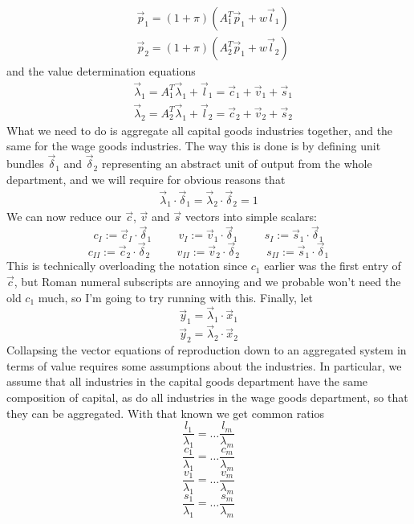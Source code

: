 \begin{align}
	& \vec{p}_1 = (1+\pi)(A_1^T\vec{p}_1 + w\vec{l}_1) \\
	& \vec{p}_2 = (1+\pi)(A_2^T\vec{p}_1 + w\vec{l}_2) 
\end{align}
and the value determination equations
\begin{align}
	& \vec{\lambda}_1 = A_1^T\vec{\lambda}_1 + \vec{l}_1 = \vec{c}_1 + \vec{v}_1 + \vec{s}_1 \\
	& \vec{\lambda}_2 = A_2^T\vec{\lambda}_1 + \vec{l}_2 = \vec{c}_2 + \vec{v}_2 + \vec{s}_2
\end{align}
What we need to do is aggregate all capital goods industries together, and the same for the wage goods industries. The way this is done is by defining unit bundles $\vec{\delta}_1$ and $\vec{\delta}_2$ representing an abstract unit of output from the whole department, and we will require for obvious reasons that 
\begin{align}
	\vec{\lambda}_1 \cdot \vec{\delta}_1 = \vec{\lambda}_2 \cdot \vec{\delta}_2 = 1 
\end{align}
We can now reduce our $\vec{c}$, $\vec{v}$ and $\vec{s}$ vectors into simple scalars:
\[ c_I := \vec{c}_I \cdot \vec{\delta}_1 \hspace{1cm} v_I := \vec{v}_1 \cdot \vec{\delta}_1 \hspace{1cm} s_I := \vec{s}_1 \cdot \vec{\delta}_1 \]
\[ c_{II} := \vec{c}_2 \cdot \vec{\delta}_2 \hspace{1cm} v_{II} := \vec{v}_2 \cdot \vec{\delta}_2 \hspace{1cm} s_{II} := \vec{s}_1 \cdot \vec{\delta}_1 \]
This is technically overloading the notation since $c_1$ earlier was the first entry of $\vec{c}$, but Roman numeral subscripts are annoying and we probable won't need the old $c_1$ much, so I'm going to try running with this. Finally, let 
\[ \vec{y}_1 = \vec{\lambda}_1 \cdot \vec{x}_1 \]
\[ \vec{y}_2 = \vec{\lambda}_2 \cdot \vec{x}_2 \]
Collapsing the vector equations of reproduction down to an aggregated system in terms of value requires some assumptions about the industries. In particular, we assume that all industries in the capital goods department have the same composition of capital, as do all industries in the wage goods department, so that they can be aggregated. With that known we get common ratios 
\[ \frac{l_1}{\lambda_1} = \ldots \frac{l_m}{\lambda_m} \]
\[ \frac{c_1}{\lambda_1} = \ldots \frac{c_m}{\lambda_m} \]
\[ \frac{v_1}{\lambda_1} = \ldots \frac{v_m}{\lambda_m} \]
\[ \frac{s_1}{\lambda_1} = \ldots \frac{s_m}{\lambda_m} \]
